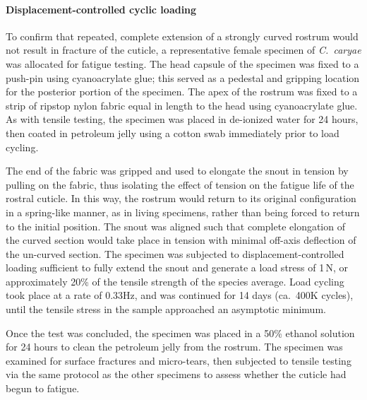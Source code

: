 \documentclass[twocolumn, linenumbers, superscriptaddress, nofootinbib]{revtex4-1}
\begin{document}
			\paragraph*{Displacement-controlled cyclic loading}
				To confirm that repeated, complete extension of a strongly curved rostrum would not result in fracture of the cuticle, a representative female specimen of \textit{C.~caryae} was allocated for fatigue testing.
				The head capsule of the specimen was fixed to a push-pin using cyanoacrylate glue; this served as a pedestal and gripping location for the posterior portion of the specimen.
				The apex of the rostrum was fixed to a strip of ripstop nylon fabric equal in length to the head using cyanoacrylate glue.
				As with tensile testing, the specimen was placed in de-ionized water for 24 hours, then coated in petroleum jelly using a cotton swab immediately prior to load cycling.
				
				The end of the fabric was gripped and used to elongate the snout in tension by pulling on the fabric, thus isolating the effect of tension on the fatigue life of the rostral cuticle.
				In this way, the rostrum would return to its original configuration in a spring-like manner, as in living specimens, rather than being forced to return to the initial position.
				The snout was aligned such that complete elongation of the curved section would take place in tension with minimal off-axis deflection of the un-curved section.
				The specimen was subjected to displacement-controlled loading sufficient to fully extend the snout and generate a load stress of 1\,N, or approximately 20\% of the tensile strength of the species average.
				Load cycling took place at a rate of 0.33Hz, and was continued for 14 days (ca.~400K cycles), until the tensile stress in the sample approached an asymptotic minimum.
				
				Once the test was concluded, the specimen was placed in a 50\% ethanol solution for 24 hours to clean the petroleum jelly from the rostrum.
				The specimen was examined for surface fractures and micro-tears, then subjected to tensile testing via the same protocol as the other specimens to assess whether the cuticle had begun to fatigue.
		
\end{document}
